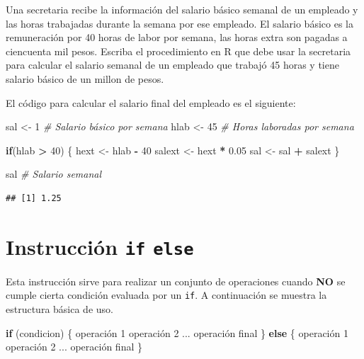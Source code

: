 \documentclass[10pt,]{krantz}
\makeatletter
\newenvironment{Shaded}{\begin{snugshade}}{\end{snugshade}}
\newcommand{\DecValTok}[1]{\textcolor[rgb]{0.00,0.00,0.81}{#1}}
\newcommand{\FloatTok}[1]{\textcolor[rgb]{0.00,0.00,0.81}{#1}}
\newcommand{\StringTok}[1]{\textcolor[rgb]{0.31,0.60,0.02}{#1}}
\newcommand{\CommentTok}[1]{\textcolor[rgb]{0.56,0.35,0.01}{\textit{#1}}}
\newcommand{\ControlFlowTok}[1]{\textcolor[rgb]{0.13,0.29,0.53}{\textbf{#1}}}
\newcommand{\OperatorTok}[1]{\textcolor[rgb]{0.81,0.36,0.00}{\textbf{#1}}}
\newcommand{\NormalTok}[1]{#1}
\let\proglang=\textsf
\newenvironment{kframe}{%
\medskip{}
\setlength{\fboxsep}{.8em}
 \def\at@end@of@kframe{}%
 \ifinner\ifhmode%
  \def\at@end@of@kframe{\end{minipage}}%
  \begin{minipage}{\columnwidth}%
 \fi\fi%
 \def\FrameCommand##1{\hskip\@totalleftmargin \hskip-\fboxsep
 \colorbox{shadecolor}{##1}\hskip-\fboxsep
     \hskip-\linewidth \hskip-\@totalleftmargin \hskip\columnwidth}%
 \MakeFramed {\advance\hsize-\width
   \@totalleftmargin\z@ \linewidth\hsize
   \@setminipage}}%
 {\par\unskip\endMakeFramed%
 \at@end@of@kframe}
\renewenvironment{Shaded}{\begin{kframe}}{\end{kframe}}
\makeatother
\begin{document}
Una secretaria recibe la información del salario básico semanal de un
empleado y las horas trabajadas durante la semana por ese empleado. El
salario básico es la remuneración por 40 horas de labor por semana, las
horas extra son pagadas a ciencuenta mil pesos. Escriba el procedimiento
en \proglang{R} que debe usar la secretaria para calcular el salario
semanal de un empleado que trabajó 45 horas y tiene salario básico de un
millon de pesos.

El código para calcular el salario final del empleado es el siguiente:

\begin{Shaded}
\begin{Highlighting}[]
\NormalTok{sal <-}\StringTok{ }\DecValTok{1}  \CommentTok{# Salario básico por semana}
\NormalTok{hlab <-}\StringTok{ }\DecValTok{45}   \CommentTok{# Horas laboradas por semana}

\ControlFlowTok{if}\NormalTok{(hlab }\OperatorTok{>}\StringTok{ }\DecValTok{40}\NormalTok{) \{}
\NormalTok{  hext <-}\StringTok{ }\NormalTok{hlab }\OperatorTok{-}\StringTok{ }\DecValTok{40}
\NormalTok{  salext <-}\StringTok{ }\NormalTok{hext }\OperatorTok{*}\StringTok{ }\FloatTok{0.05}
\NormalTok{  sal <-}\StringTok{ }\NormalTok{sal }\OperatorTok{+}\StringTok{ }\NormalTok{salext}
\NormalTok{\}}

\NormalTok{sal  }\CommentTok{# Salario semanal}
\end{Highlighting}
\end{Shaded}

\begin{verbatim}
## [1] 1.25
\end{verbatim}

\section{\texorpdfstring{Instrucción \texttt{if} \texttt{else}
}{Instrucción if else }}\label{instruccion-if-else}

Esta instrucción sirve para realizar un conjunto de operaciones cuando
\textbf{NO} se cumple cierta condición evaluada por un \texttt{if}. A
continuación se muestra la estructura básica de uso.

\begin{Shaded}
\begin{Highlighting}[]
\ControlFlowTok{if}\NormalTok{ (condicion) \{}
\NormalTok{  operación }\DecValTok{1}
\NormalTok{  operación }\DecValTok{2}
\NormalTok{  ...}
\NormalTok{  operación final}
\NormalTok{\}}
\ControlFlowTok{else}\NormalTok{ \{}
\NormalTok{  operación }\DecValTok{1}
\NormalTok{  operación }\DecValTok{2}
\NormalTok{  ...}
\NormalTok{  operación final}
\NormalTok{\}}
\end{Highlighting}
\end{Shaded}
\end{document}
